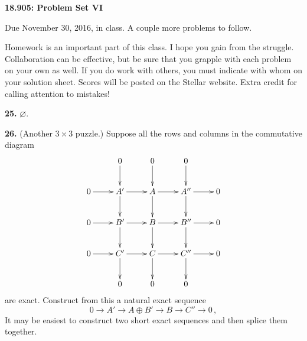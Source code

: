 \documentclass[12pt]{article}
\begin{document}
\thispagestyle{empty}

\def\da#1{\downarrow\rlap{$\vcenter{\hbox{$\scriptstyle#1$}}$}}
\def\ua#1{\uparrow\rlap{$\vcenter{\hbox{$\scriptstyle#1$}}$}}

\def\coker{\mathrm{coker}\,}
\def\im{\mathrm{im}\,}
\def\ker{\mathrm{ker}\,}
\def\NN{\mathbb N}
\def\ZZ{\mathbb Z}
\def\RR{\mathbb R}
\def\QQ{\mathbb Q} 
\def\CC{\mathbb C}
\def\FF{\mathbb F}
\def\Ext{\mathrm{Ext}}
\def\Tor{\mathrm{Tor}}
\def\Hom{\mathrm{Hom}}
\def\Der{\mathrm{Der}}
\def\Map{\mathrm{Map}}
\def\Gp{\mathbf{Gp}}
\def\Mon{\mathbf{Mon}}
\def\mod{\hbox{mod}}
\def\be{\begin{equation}}
\def\ee{\end{equation}}
\def\tensor{\otimes}
\def\iso{\cong}
\def\Ho{\mathrm{Ho}\,}
\def\rin{\mathrm{in}}
\def\Fun{\mathrm{Fun}}
\def\id{\mathrm{id}}
\def\nt{\mathrm{nt}}

\def\la#1{\mathop{\longleftarrow}\limits^{#1}}
\def\ra#1{\mathop{\longrightarrow}\limits^{#1}}


\def\bS{\mathbf{S}}

\def\inj{\mathrm{in}}
\def\pr{\mathrm{pr}}
\def\div{\mathrm{div}}
\def\grad{\mathrm{grad}}
\def\curl{\mathrm{curl}}
\def\Sin{\mathrm{Sin}}

\def\SF{\mathcal{C}^\infty}
\def\VF{\mathcal{VF}^\infty}


\def\TT{\mathbb{T}}
\def\Tensor{\bigotimes}
\def\bDelta{\mathbf{\Delta}}
\def\bSet{\mathbf{Set}}
\def\bAb{\mathbf{Ab}}
\def\bTop{\mathbf{Top}}
\def\bC{\mathbf{C}}
\def\ob{\mathrm{ob}}
\def\bVS{\mathbf{VS}}

\def\cP{\mathcal{P}}
\def\cE{\mathcal{E}}


\begin{center}
{\bf 18.905: Problem Set VI}
\end{center}

Due November 30, 2016, in class. A couple more problems to follow.

Homework is an important part of this class. I hope you gain from the
struggle. Collaboration can be effective, but be sure that you
grapple with each problem on your own as well. If you do work with others,
you must indicate with whom on your solution sheet. Scores will be posted
on the Stellar website. Extra credit for calling attention to mistakes!

\bigskip
{\bf 25.} $\varnothing$.

\medskip
{\bf 26.} (Another $3\times3$ puzzle.) Suppose all the rows and columns in
the commutative diagram
\[
\xymatrix{
& 0 \ar[d] & 0 \ar[d] & 0 \ar[d] & \\
0 \ar[r] & A' \ar[d] \ar[r] & A \ar[d] \ar[r] & A'' \ar[d] \ar[r] & 0 \\
0 \ar[r] & B' \ar[d] \ar[r] & B \ar[d] \ar[r] & B'' \ar[d] \ar[r] & 0 \\
0 \ar[r] & C' \ar[d] \ar[r] & C \ar[d] \ar[r] & C'' \ar[d] \ar[r] & 0 \\ 
& 0 & 0 & 0 &
}\]
are exact. Construct from this a natural exact sequence 
\[
0\to A'\to A\oplus B'\to B\to C''\to0\,,
\]
It may be easiest to construct two short exact sequences and then splice them
together.
\end{document}
